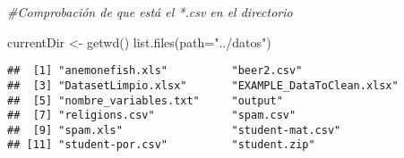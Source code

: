 \documentclass[
]{article}
\newenvironment{Shaded}{\begin{snugshade}}{\end{snugshade}}
\newcommand{\AttributeTok}[1]{\textcolor[rgb]{0.77,0.63,0.00}{#1}}
\newcommand{\CommentTok}[1]{\textcolor[rgb]{0.56,0.35,0.01}{\textit{#1}}}
\newcommand{\FunctionTok}[1]{\textcolor[rgb]{0.00,0.00,0.00}{#1}}
\newcommand{\NormalTok}[1]{#1}
\newcommand{\OtherTok}[1]{\textcolor[rgb]{0.56,0.35,0.01}{#1}}
\newcommand{\StringTok}[1]{\textcolor[rgb]{0.31,0.60,0.02}{#1}}
\begin{document}
\begin{Shaded}
\begin{Highlighting}[]
\CommentTok{\#Comprobación de que está el *.csv en el directorio}

\NormalTok{currentDir }\OtherTok{\textless{}{-}} \FunctionTok{getwd}\NormalTok{()}
\FunctionTok{list.files}\NormalTok{(}\AttributeTok{path=}\StringTok{"../datos"}\NormalTok{)}
\end{Highlighting}
\end{Shaded}

\begin{verbatim}
##  [1] "anemonefish.xls"          "beer2.csv"               
##  [3] "DatasetLimpio.xlsx"       "EXAMPLE_DataToClean.xlsx"
##  [5] "nombre_variables.txt"     "output"                  
##  [7] "religions.csv"            "spam.csv"                
##  [9] "spam.xls"                 "student-mat.csv"         
## [11] "student-por.csv"          "student.zip"
\end{verbatim}
\end{document}
